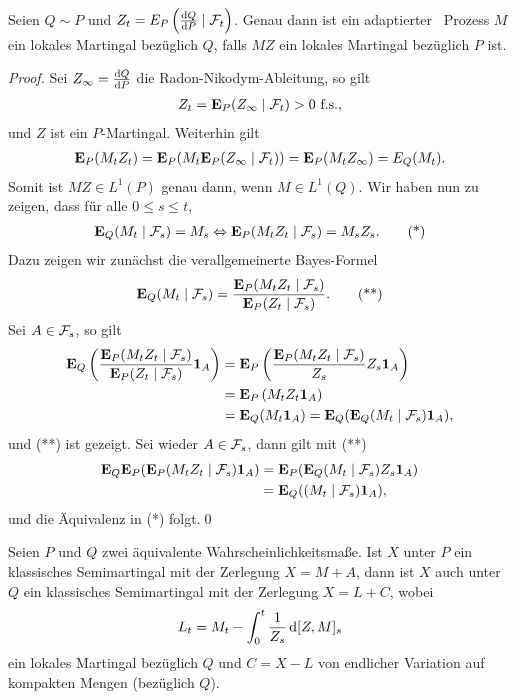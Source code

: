\begin{lem}
\label{lem:3.1}
Seien $Q \sim P$ und $Z_t=E_P\left( \frac{\mathrm{d} Q}{\mathrm{d} P} \mid \mathcal{F}_t \right)$. Genau
dann ist ein adaptierter \cadlag\ Prozess $M$ ein lokales Martingal bezüglich $Q$, falls $MZ$ ein lokales Martingal bezüglich
  $P$ ist.\fish
\end{lem}
\begin{proof}
Sei $Z_\infty = \frac{\mathrm{d} Q}{\mathrm{d} P}$ die Radon-Nikodym-Ableitung, so gilt
\begin{align*}
Z_t = \mathbf{E}_P(Z_\infty\mid \mathcal{F}_t) > 0\ \text{f.s.},
\end{align*}
und $Z$ ist ein $P$-Martingal. Weiterhin gilt
\begin{align*}
\mathbf{E}_P(M_tZ_t) = \mathbf{E}_P(M_t\mathbf{E}_P(Z_\infty\mid \mathcal{F}_t)) = \mathbf{E}_P(M_t Z_\infty) =
E_Q(M_t).
\end{align*}
Somit ist $MZ\in L^1(P)$ genau dann, wenn $M\in L^1(Q)$. Wir haben nun zu
zeigen, dass für alle $0 \le s \le t$,
\begin{align*}
\mathbf{E}_Q(M_t\mid \mathcal{F}_s) = M_s \Leftrightarrow 
\mathbf{E}_P(M_tZ_t\mid \mathcal{F}_s) = M_sZ_s.\tag{*}
\end{align*}
Dazu zeigen wir zunächst die verallgemeinerte Bayes-Formel
\begin{align*}
\mathbf{E}_Q(M_t\mid \mathcal{F}_s) = 
\frac{\mathbf{E}_P(M_tZ_t\mid \mathcal{F}_s)}{\mathbf{E}_P(Z_t\mid \mathcal{F}_s)}.\tag{**}
\end{align*}
Sei $A\in\mathcal{F}_s$, so gilt
\begin{align*}
\mathbf{E}_Q\left(\frac{\mathbf{E}_P(M_tZ_t\mid \mathcal{F}_s)}{\mathbf{E}_P(Z_t\mid \mathcal{F}_s)} \mathbf{1}_A\right) &=
\mathbf{E}_P\left(\frac{\mathbf{E}_P(M_tZ_t\mid \mathcal{F}_s)}{Z_s} Z_s \mathbf{1}_A\right) \\
&=  \mathbf{E}_P\left(M_t Z_t \mathbf{1}_A\right)\\
&= \mathbf{E}_Q(M_t\mathbf{1}_A) =  \mathbf{E}_Q(\mathbf{E}_Q(M_t\mid\mathcal{F}_s)\mathbf{1}_A),
\end{align*}
und (**) ist gezeigt. Sei wieder $A\in\mathcal{F}_s$, dann gilt mit (**)
\begin{align*}
\mathbf{E}_Q
\mathbf{E}_P(\mathbf{E}_P(M_tZ_t\mid\mathcal{F}_s)\mathbf{1}_A) &= 
\mathbf{E}_P(\mathbf{E}_Q(M_t\mid\mathcal{F}_s)Z_s\mathbf{1}_A) \\
&= \mathbf{E}_Q((M_t\mid\mathcal{F}_s) \mathbf{1}_A),
\end{align*}
und die Äquivalenz in (*) folgt.\qed
\end{proof}


\begin{theorem}
\label{prop:3.8}
 Seien $P$ und $Q$ zwei äquivalente
  Wahrscheinlichkeitsmaße. Ist $X$ unter $P$ ein klassisches Semimartingal mit
  der Zerlegung $X=M+A$, dann ist $X$ auch unter $Q$ ein klassisches
  Semimartingal mit der Zerlegung $X=L+C$, wobei
  \begin{align*}
  L_t = M_t - \int_0^t \frac{1}{Z_s}\, \mathrm{d}[Z,M]_s
  \end{align*}
ein lokales Martingal bezüglich $Q$ und $C=X-L$ von endlicher Variation
auf kompakten Mengen (bezüglich $Q$).\fish
\end{theorem}

